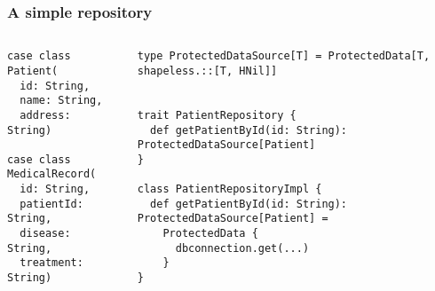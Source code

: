 \documentclass[aspectratio=169]{beamer}
\begin{document}
\begin{frame}[fragile]
\frametitle{A simple repository}

\begin{columns}
\begin{column}{0.3\textwidth}

\begin{lstlisting}[style=myScalastyle,frame=none]
case class Patient(
  id: String,
  name: String,
  address: String)
  
case class MedicalRecord(
  id: String,
  patientId: String,
  disease: String,
  treatment: String)
\end{lstlisting}


\end{column}
\vrule
\begin{column}{0.7\textwidth}  

\begin{lstlisting}[style=myScalastyle,frame=none]
type ProtectedDataSource[T] = ProtectedData[T, shapeless.::[T, HNil]]  


trait PatientRepository {
  def getPatientById(id: String): ProtectedDataSource[Patient]
}

class PatientRepositoryImpl {
  def getPatientById(id: String): ProtectedDataSource[Patient] =
    ProtectedData {
      dbconnection.get(...)
    }
}

\end{lstlisting}


\end{column}
\end{columns}

\end{frame}
\end{document}
